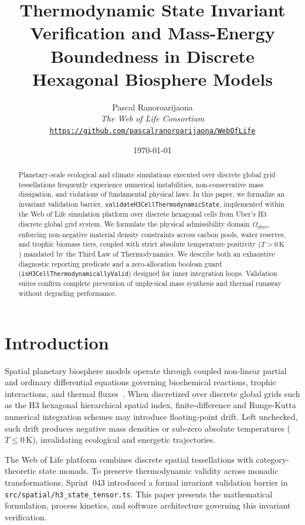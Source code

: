\documentclass[10pt,twocolumn,letterpaper]{article}
\title{\textbf{Thermodynamic State Invariant Verification and Mass-Energy Boundedness in Discrete Hexagonal Biosphere Models}}
\author{
    Pascal Ranoroarijaona \\
    \textit{The Web of Life Consortium} \\
    \texttt{\url{https://github.com/pascalranoroarijaona/WebOfLife}}
}
\date{\today}
\begin{document}
\maketitle

\begin{abstract}
Planetary-scale ecological and climate simulations executed over discrete global grid tessellations frequently experience numerical instabilities, non-conservative mass dissipation, and violations of fundamental physical laws. In this paper, we formalize an invariant validation barrier, \texttt{validateH3CellThermodynamicState}, implemented within the Web of Life simulation platform over discrete hexagonal cells from Uber's H3 discrete global grid system. We formulate the physical admissibility domain $\Omega_{\text{phys}}$, enforcing non-negative material density constraints across carbon pools, water reserves, and trophic biomass tiers, coupled with strict absolute temperature positivity ($T > 0\,\text{K}$) mandated by the Third Law of Thermodynamics. We describe both an exhaustive diagnostic reporting predicate and a zero-allocation boolean guard (\texttt{isH3CellThermodynamicallyValid}) designed for inner integration loops. Validation suites confirm complete prevention of unphysical mass synthesis and thermal runaway without degrading performance.
\end{abstract}

\section{Introduction}
Spatial planetary biosphere models operate through coupled non-linear partial and ordinary differential equations governing biochemical reactions, trophic interactions, and thermal fluxes~\cite{lenton2016earth}. When discretized over discrete global grids such as the H3 hexagonal hierarchical spatial index, finite-difference and Runge-Kutta numerical integration schemes may introduce floating-point drift. Left unchecked, such drift produces negative mass densities or sub-zero absolute temperatures ($T \le 0\,\text{K}$), invalidating ecological and energetic trajectories.

The Web of Life platform combines discrete spatial tessellations with category-theoretic state monads. To preserve thermodynamic validity across monadic transformations, Sprint~043 introduced a formal invariant validation barrier in \texttt{src/spatial/h3\_state\_tensor.ts}. This paper presents the mathematical formulation, process kinetics, and software architecture governing this invariant verification.
\end{document}
